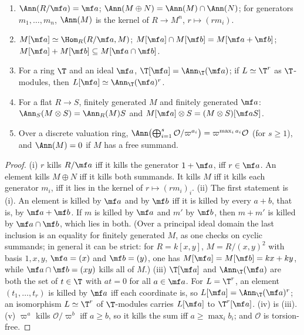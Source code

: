 \begin{proposition}\label{prop:modules:annihilator}
\begin{enumerate}[label=(\roman*)]
\item $\Ann(R/\mf a)=\mf a$; $\Ann(M\oplus N)=\Ann(M)\cap\Ann(N)$; for generators $m_1,\dots,m_n$, $\Ann(M)$ is the kernel of $R\to M^n$, $r\mapsto(rm_i)$.
\item $M[\mf a]\simeq\Hom_R(R/\mf a,M)$; $M[\mf a]\cap M[\mf b]=M[\mf a+\mf b]$; $M[\mf a]+M[\mf b]\subseteq M[\mf a\cap\mf b]$.
\item For a ring $\T$ and an ideal $\mf a$, $\T[\mf a]=\Ann_\T(\mf a)$; if $L\simeq\T^r$ as $\T$-modules, then $L[\mf a]\simeq\Ann_\T(\mf a)^r$.
\item For a flat $R\to S$, finitely generated $M$ and finitely generated $\mf a$: $\Ann_S(M\otimes S)=\Ann_R(M)S$ and $M[\mf a]\otimes S=(M\otimes S)[\mf aS]$.
\item Over a discrete valuation ring, $\Ann\bigl(\bigoplus_{i=1}^s\mathcal O/\varpi^{a_i}\bigr)=\varpi^{\max_ia_i}\mathcal O$ (for $s\ge1$), and $\Ann(M)=0$ if $M$ has a free summand.
\end{enumerate}
\end{proposition}

\begin{proof}
(i) $r$ kills $R/\mf a$ iff it kills the generator $1+\mf a$, iff $r\in\mf a$. An element kills $M\oplus N$ iff it kills both summands. It kills
$M$ iff it kills each generator $m_i$, iff it lies in the kernel of $r\mapsto(rm_i)_i$.
(ii) The first statement is (i). An element is killed by $\mf a$ and by $\mf b$ iff it is killed by every $a+b$, that is,
by $\mf a+\mf b$. If $m$ is killed by $\mf a$ and $m'$ by $\mf b$, then $m+m'$ is killed by $\mf a\cap\mf b$, which lies in both. (Over a principal ideal
domain the last inclusion is an equality for finitely generated $M$, as one checks on cyclic summands; in general it can be strict: for
$R=k[x,y]$, $M=R/(x,y)^2$ with basis $1,x,y$, $\mf a=(x)$ and $\mf b=(y)$, one has $M[\mf a]=M[\mf b]=kx+ky$, while $\mf a\cap\mf b=(xy)$ kills all of $M$.)
(iii) $\T[\mf a]$ and $\Ann_\T(\mf a)$ are both the set of $t\in\T$ with $at=0$ for all $a\in\mf a$. For $L=\T^r$, an element $(t_1,\dots,t_r)$ is killed by $\mf a$
iff each coordinate is, so $L[\mf a]=\Ann_\T(\mf a)^r$; an isomorphism $L\simeq\T^r$ of $\T$-modules carries $L[\mf a]$ to $\T^r[\mf a]$.
(iv) is (iii). (v) $\varpi^a$ kills $\mathcal O/\varpi^b$ iff $a\ge b$, so it kills the sum iff $a\ge\max_ib_i$; and $\mathcal O$ is torsion-free.
\end{proof}

